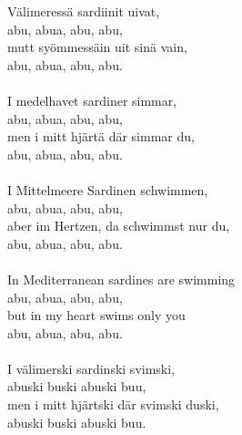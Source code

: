 
        Välimeressä sardiinit uivat, \\
        abu, abua, abu, abu, \\
        mutt syömmessäin uit sinä vain, \\
        abu, abua, abu, abu. \\
\hspace{10mm} \\
        I medelhavet sardiner simmar, \\
        abu, abua, abu, abu, \\
        men i mitt hjärtä där simmar du, \\
        abu, abua, abu, abu. \\
\hspace{10mm} \\
        I Mittelmeere Sardinen schwimmen, \\
        abu, abua, abu, abu, \\
        aber im Hertzen, da schwimmst nur du, \\
        abu, abua, abu, abu. \\
\hspace{10mm} \\
        In Mediterranean sardines are swimming \\
        abu, abua, abu, abu, \\
        but in my heart swims only you \\
        abu, abua, abu, abu. \\
\hspace{10mm} \\
        I välimerski sardinski svimski, \\
        abuski buski abuski buu, \\
        men i mitt hjärtski där svimski duski, \\
        abuski buski abuski buu. \\
